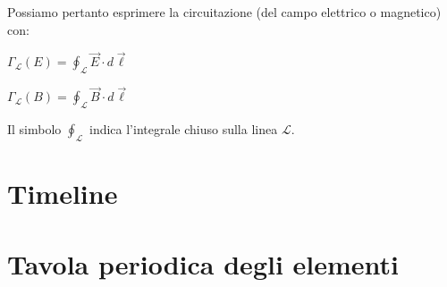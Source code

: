 \documentclass[a4paper,11pt,italian]{article}
\begin{document}
\begin{description}
  Possiamo pertanto esprimere la circuitazione (del campo elettrico o magnetico) con:
  \begin{multicols}{2}
  \begin{center}
  $ \displaystyle \Gamma_\mathscr{L}(E) = \oint_\mathscr{L} \vec{E} \cdot d\vec{\ell} $
  
  $ \displaystyle \Gamma_\mathscr{L}(B) = \oint_\mathscr{L} \vec{B} \cdot d\vec{\ell} $
  \end{center}
  \end{multicols}
  Il simbolo $ \oint_\mathscr{L} $ indica l'integrale chiuso sulla linea $ \mathscr{L} $.
\end{description}



\newpage
\section{Timeline}
\begin{turn}{90}
\begin{minipage}{\linewidth}
\scalebox{.66}{}
\end{minipage}
\end{turn}

\newpage
\section{Tavola periodica degli elementi}

\end{document}
